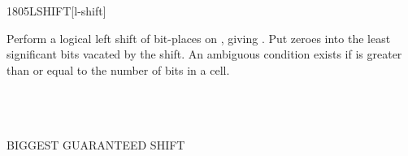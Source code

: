 \begin{worddef}{1805}{LSHIFT}[l-shift]
\item {}

	Perform a logical left shift of  bit-places on
	, giving . Put zeroes into the least
	significant bits vacated by the shift. An ambiguous condition
	exists if  is greater than or equal to the number of
	bits in a cell.

	\begin{testing} %
		 \\
		 \\
		 \\
		 \tab[2]  BIGGEST GUARANTEED SHIFT \\
		 \\
	\end{testing}
\end{worddef}


